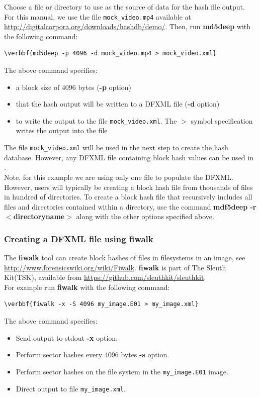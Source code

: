 \documentclass[11pt,fleqn]{article} %
\begin{document}
Choose a file or directory to use as the source of data for the hash file output. For this manual, we use the file \texttt{mock\_video.mp4} available at \url{http://digitalcorpora.org/downloads/hashdb/demo/}. Then, run \textbf{md5deep} with the following command:\\
\begin{Verbatim}[commandchars=\\\{\}]
\verbbf{md5deep -p 4096 -d mock_video.mp4 > mock_video.xml}
\end{Verbatim}
The above command specifies:
\begin{itemize}
\item a block size of 4096 bytes (\textbf{-p} option) 
\item that the hash output will be written to a DFXML file (\textbf{-d} option)
\item to write the output to the file \texttt{mock\_video.xml}. The  $>$ symbol specification writes the output into the file 
\end{itemize}
 The file \texttt{mock\_video.xml} will be used in the next step to create the hash database. However, any DFXML file containing block hash values can be used in \hash.\\

Note, for this example we are using only one file to populate the DFXML. However, users will typically be creating a block hash file from thousands of files in hundred of directories. To create a block hash file that recursively includes all files and directories contained within a directory, use the command \textbf{mdf5deep -r $<$directoryname$>$} along with the other options specified above.

\subsubsection{Creating a DFXML file using \textbf{fiwalk}}
The \textbf{fiwalk} tool can create block hashes of files in filesystems
in an image,
see \url{http://www.forensicswiki.org/wiki/Fiwalk}.
\textbf{fiwalk} is part of The Sleuth Kit\textregistered\xspace (TSK),
available from \url{https://github.com/sleuthkit/sleuthkit}. \\

For example run \textbf{fiwalk} with the following command:\\
\begin{Verbatim}[commandchars=\\\{\}]
\verbbf{fiwalk -x -S 4096 my_image.E01 > my_image.xml}
\end{Verbatim}
The above command specifies:
\begin{itemize}
\item Send output to stdout \textbf{-x} option.
\item Perform sector hashes every 4096 bytes \textbf{-s} option.
\item Perform sector hashes on the file system in the \texttt{my\_image.E01} image.
\item Direct output to file \texttt{my\_image.xml}.
\end{itemize}
\end{document}
